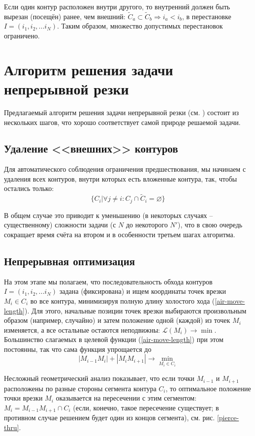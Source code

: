 \documentclass[14pt]{extarticle}
\theoremstyle{plain}%
\theoremstyle{remark}
\begin{document}
Если один контур расположен внутри другого,
то внутренний должен быть вырезан
(посещён)
ранее, чем внешний:
\( \tilde C_a \subset \tilde C_b \Rightarrow i_a < i_b \),
в перестановке
$I = (i_1, i_2, ... i_N)$.
Таким образом,
множество допустимых перестановок ограничено.

\section{Алгоритм решения задачи непрерывной резки}

Предлагаемый алгоритм решения задачи непрерывной резки
(см. \cite{berlin2019})
состоит из нескольких шагов,
что хорошо соответствует самой природе
решаемой задачи.

\subsection{Удаление <<внешних>> контуров}

Для автоматического соблюдения
ограничения предшествования,
мы начинаем с удаления всех контуров,
внутри которых есть вложенные контура,
так, чтобы остались только:
$$
\{C_i | \forall j \ne i: C_j \cap \tilde C_i = \varnothing \}
$$

В общем случае это приводит к уменьшению
(в некоторых случаях -- существенному)
сложности задачи
(с $N$ до некоторого $N'$),
что в свою очередь
сокращает время счёта
на втором и в особенности третьем
шагах алгоритма.

\subsection{Непрерывная оптимизация}

На этом этапе мы полагаем,
что последовательность обхода контуров
$I = (i_1, i_2, ... i_N)$
задана (фиксирована)
и ищем координаты точек врезки
$M_i \in C_i$
во все контура,
минимизируя полную длину холостого хода
(\ref{air-move-length}).
Для этого,
начальные позиции точек врезки выбираются
произвольным образом
(например, случайно)
и затем положение одной (каждой) из точек
$M_i$
изменяется, а все остальные остаются неподвижны:
$\mathcal{L}(M_i) \to \min$.
Большинство слагаемых в целевой функции
(\ref{air-move-length})
при этом постоянны,
так что сама функция упрощается до
$$
|M_{i-1}M_i|+|M_iM_{i+1}| \to \min_{M_i \in C_i}
$$

Несложный геометрический анализ показывает,
что если точки
$M_{i-1}$
и
$M_{i + 1}$
расположены по разные стороны сегмента контура
$C_i$,
то оптимальное положение точки врезки
$M_i$
оказывается на пересечении с этим сегментом:
$M_i = M_{i-1} M_{i + 1} \cap C_i$
(если, конечно,
такое пересечение существует;
в противном случае
решением будет один из концов сегмента),
см. рис. \ref{pierce-thru}.
\end{document}
